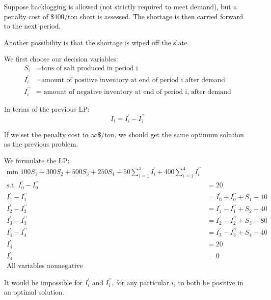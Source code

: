\documentclass{article}
\begin{document}
\begin{eg}
    Suppose backlogging is allowed (not strictly required to meet demand), 
    but a penalty cost of \$400/ton short is assessed. The shortage is then carried 
    forward to the next period.
    
    Another possibility is that the shortage is wiped off the slate.
\end{eg}
\begin{answer}
    We first choose our decision variables: \\
    \begin{align*}
        S_i&=\text{tons of salt produced in period i} \\
        I_i^{\prime} &=\text{amount of positive inventory at end of period i after demand} \\
        I_i^{\prime\prime} &=\text{ amount of negative inventory at end of period i, after demand}
    \end{align*}

    \begin{note}
        In terms of the previous LP: \\
        \[
            I_i=I_i^{\prime} -I_i^{\prime\prime} 
        \]

        If we set the penalty cost to \(\infty \)\$/ton, we should get the same optimum 
        solution as the previous problem. 
    \end{note}

    We formulate the LP: \\
    \begin{align*}
        \text{min }100S_1+300S_2+500S_3+250S_4+50\sum_{i=1}^4I_i^{\prime} +400\sum_{i=1}^4I_i^{\prime\prime} \\
        \text{s.t. }I_0^{\prime}-I_0^{\prime\prime}&=20 \\
        I_1^{\prime} -I_1^{\prime\prime} &=I_0^{\prime} +I_0^{\prime\prime} +S_1-10 \\
        I_2^{\prime} -I_2^{\prime\prime} &=I_1^{\prime} -I_1^{\prime\prime} +S_2-40 \\
        I_3^{\prime} -I_3^{\prime\prime} &=I_2^{\prime} -I_2^{\prime\prime} +S_3-80 \\
        I_4^{\prime} -I_4^{\prime\prime} &=I_3^{\prime} -I_3^{\prime\prime} +S_4-40 \\
        I_4^{\prime}&=20 \\
        I_4^{\prime\prime}&=0 \\
        \text{All variables nonnegative}
    \end{align*}

    \begin{note}
        It would be impossible for \(I_i^{\prime} \) and \(I_i^{\prime\prime} \), 
        for any particular \(i\), to both be positive in an optimal solution.   
    \end{note}
\end{answer}
\end{document}
